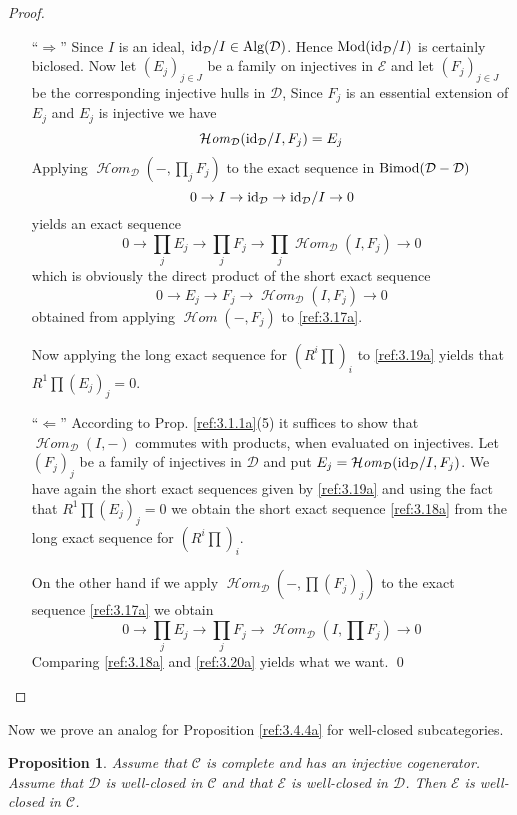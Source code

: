 \documentclass{amsproc}
\def\Cscr{{\mathcal C}}
\def\Dscr{{\mathcal D}}
\def\Escr{{\mathcal E}}
\def\Hscr{{\mathcal H}}
\def\HHom{\operatorname {\Hscr \mathit{om}}}
\def\id{\text{id}}
\def\Id{\text{id}}
\def\Mod{\mathop{\text{Mod}}}
\def\Bimod{\mathop{\text{Bimod}}}
\def\Alg{\mathop{\text{Alg}}}
\def\HHom{\operatorname {\Hscr \mathit{om}}}
\def\r{\rightarrow}
\let\oldtext\text
\def\text#1{\oldtext{\upshape #1}}
\newtheorem{propositions}[lemmas]{Proposition}
\theoremstyle{definition}
\theoremstyle{remark}
\numberwithin{equation}{section}
\numberwithin{table}{section}
\numberwithin{figure}{section}
\begin{document}
\begin{proof}
\begin{itemize}
\item [``$\Rightarrow$''] Since $I$ is an ideal, $\Id_\Dscr/I\in \Alg(\Dscr)$.
Hence $\Mod(\Id_\Dscr/I)$ is certainly biclosed. Now let $(E_j)_{j\in J}$
be a family
on injectives in $\Escr$ and let $(F_j)_{j\in J}$ be the corresponding injective
hulls in $\Dscr$, Since $F_j$ is an essential extension of $E_j$ and $E_j$ is
injective we have
\[
\HHom_\Dscr(\Id_\Dscr/I,F_j)=E_j
\]
Applying $\HHom_\Dscr(-,\prod_j F_j)$ to the exact sequence in
$\Bimod(\Dscr-\Dscr)$
\begin{equation}
\label{ref:3.17a}
0\r I\r \id_\Dscr\r \Id_\Dscr/I\r 0
\end{equation}
yields an exact sequence
\begin{equation}
\label{ref:3.18a}
0\r \prod_j E_j \r \prod_j F_j\r\prod_j \HHom_\Dscr(I,F_j)\r 0
\end{equation}
which is obviously the direct product of the short exact sequence
\begin{equation}
\label{ref:3.19a}
0\r E_j \r F_j \r \HHom_\Dscr(I,F_j)\r 0
\end{equation}
obtained from applying $\HHom(-,F_j)$ to \eqref{ref:3.17a}.

Now applying the long exact sequence for $(R^i\prod)_i$ to \eqref{ref:3.19a} yields
that $R^1\prod (E_j)_j=0$.
\item [``$\Leftarrow$''] According to Prop. \ref{ref:3.1.1a}(5) it
  suffices to show that $\HHom_\Dscr(I,-)$ commutes with products,
  when evaluated on injectives. Let $(F_j)_j$ be a family of
  injectives in $\Dscr$ and put $E_j=\HHom_\Dscr(\Id_{\Dscr}/I,F_j)$.
  We have again the short exact sequences given by \eqref{ref:3.19a} and
  using the fact that $R^1\prod (E_j)_j=0$ we obtain the short exact
  sequence \eqref{ref:3.18a} from the long exact sequence for $(R^i\prod)_i$.

On the other hand if we apply $\HHom_\Dscr(-,\prod (F_j)_j)$ to the exact
sequence \eqref{ref:3.17a} we obtain
\begin{equation}
\label{ref:3.20a}
0\r \prod_j E_j \r \prod_j F_j \r \HHom_\Dscr(I,\prod F_j)\r 0
\end{equation}
Comparing \eqref{ref:3.18a} and \eqref{ref:3.20a} yields what we want. \qed
\end{itemize}
\def\qed{}\end{proof}
Now we prove an analog for Proposition \ref{ref:3.4.4a}  for well-closed
subcategories.
\begin{propositions}
\label{ref:3.5.8a}
Assume that $\Cscr$ is complete and has an injective cogenerator. Assume that
$\Dscr$ is well-closed in $\Cscr$ and that $\Escr$ is well-closed in $\Dscr$.
Then $\Escr$ is well-closed in $\Cscr$.
\end{propositions}
\end{document}

